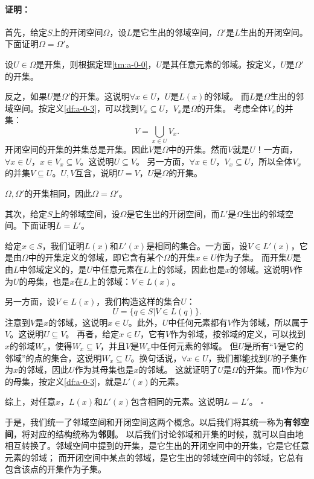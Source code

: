 \documentclass[12pt,UTF8]{ctexbook}
\theoremstyle{definition}
\theoremstyle{plain}
\renewenvironment{proof}{\paragraph{\textbf{证明：}}}{\hfill$\square$}
\begin{document}
\begin{appendix}
\begin{proof}
    首先，给定$S$上的开闭空间$\Omega$，设$L$是它生出的邻域空间，$\Omega'$是$L$生出的开闭空间。下面证明$\Omega = \Omega'$。
    
    设$U\in\Omega$是开集，则根据定理\ref{tm:a-0-0}，$U$是其任意元素的邻域。按定义，$U$是$\Omega'$的开集。

    反之，如果$U$是$\Omega'$的开集。这说明$\forall x \in U$，$U$是$L(x)$的邻域。
    而$L$是$\Omega$生出的邻域空间。按定义\ref{df:a-0-3}，可以找到$V_x\subseteq U$，$V_x$是$\Omega$的开集。
    考虑全体$V_x$的并集：
    $$V = \bigcup_{x\in U} V_x. $$
    开闭空间的开集的并集总是开集。因此$V$是$\Omega$中的开集。然而$V$就是$U$！一方面，$\forall x\in U$，$x\in V_x \subseteq V$。这说明$U\subseteq V$。
    另一方面，$\forall x\in U$，$V_x\subseteq U$，所以全体$V_x$的并集$V\subseteq U$。$U, V$互含，说明$U = V$，$U$是$\Omega$的开集。

    $\Omega,\Omega'$的开集相同，因此$\Omega = \Omega'$。

    其次，给定$S$上的邻域空间，设$\Omega$是它生出的开闭空间，而$L'$是$\Omega$生出的邻域空间。下面证明$L=L'$。

    给定$x\in S$，我们证明$L(x)$和$L'(x)$是相同的集合。一方面，设$V\in L'(x)$，它是由$\Omega$中的开集定义的邻域，即它含有某个$\Omega$的开集$x\in U$作为子集。
    而开集$U$是由$L$中邻域定义的，是$U$中任意元素在$L$上的邻域，因此也是$x$的邻域。这说明$V$作为$U$的母集，也是$x$在$L$上的邻域：$V\in L(x)$。

    另一方面，设$V\in L(x)$，我们构造这样的集合$U$：
    $$ U = \{q \in S | V \in L(q)\}. $$
    注意到$V$是$x$的邻域，这说明$x\in U$。此外，$U$中任何元素都有$V$作为邻域，所以属于$V$。这说明$U\subseteq V$。
    再者，给定$x\in U$，它有$V$作为邻域，按邻域的定义，可以找到$x$的邻域$W_x$，使得$W_x \subseteq V$，并且$V$是$W_x$中任何元素的邻域。
    但$U$是所有“$V$是它的邻域”的点的集合，这说明$W_x\subseteq U$。换句话说，$\forall x\in U$，我们都能找到$U$的子集作为$x$的邻域，因此$U$作为其母集也是$x$的邻域。
    这就证明了$U$是$\Omega$的开集。而$V$作为$U$的母集，按定义\ref{df:a-0-3}，就是$L'(x)$的元素。

    综上，对任意$x$，$L(x)$和$L'(x)$包含相同的元素。这说明$L=L'$。    
\end{proof}

于是，我们统一了邻域空间和开闭空间这两个概念。以后我们将其统一称为\textbf{有邻空间}，将对应的结构统称为\textbf{邻则}。
以后我们讨论邻域和开集的时候，就可以自由地相互转换了。邻域空间中提到的开集，是它生出的开闭空间中的开集，它是它任意元素的邻域；
而开闭空间中某点的邻域，是它生出的邻域空间中的邻域，它总有包含该点的开集作为子集。


\end{appendix}
\end{document}
